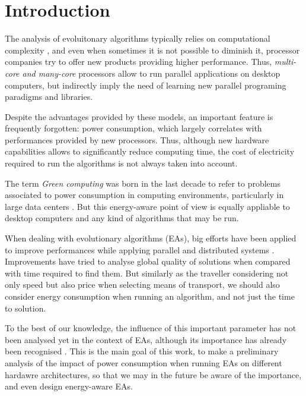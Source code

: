 \section{Introduction}

The analysis of evoluitonary algorithms typically relies on computational complexity \cite{complexity}, %
 and even when sometimes it is not possible to diminish it, processor companies try to offer new products providing higher performance.  Thus, \textit{multi-core and many-core} processors allow to run parallel applications on desktop computers, but indirectly imply the need of learning new parallel programing paradigms and libraries. %

Despite the advantages provided by these models, an important feature
is frequently forgotten:  power consumption, which largely correlates
with performances provided by new processors.  Thus, although new
hardware capabilities allows to significantly reduce computing time,
the cost of electricity required to run the algorithms is not always
taken into account.%

The term \textit{Green computing} was born in the last decade to refer
to problems associated to power consumption in computing environments,
particularly in large data centers \cite{green-computing}.  But this
energy-aware point of view is equally appliable to desktop computers
and any kind of algorithms that may be run. 

When dealing with evolutionary algorithms (EAs), big efforts have been applied to improve performances while applying parallel and distributed systems \cite{paba}.  Improvements have tried to analyse global quality of solutions when compared with time required to find them.  But similarly as the traveller considering not only speed but also price when selecting means of transport, we should also consider energy consumption when running an algorithm, and not just the time to solution.

To the best of our knowledge, the influence of this important parameter has not been analysed yet in the context of EAs, although its importance has already been recognised \cite{ephemeral}.  This is the main goal of this work, to make a preliminary analysis of the impact of power consumption when running EAs on different hardawre architectures, so that we may in the future be aware of the importance, and even design energy-aware EAs.

